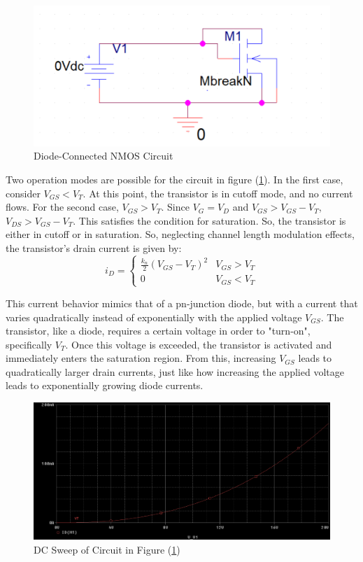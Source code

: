 \FloatBarrier

\begin{figure}[h!]
	\centering
	\includegraphics[scale=0.75]{./images/circuit3.PNG}
	\caption{Diode-Connected NMOS Circuit}
	\label{fig:circuit3}
\end{figure}

\FloatBarrier

Two operation modes are possible for the circuit in figure (\ref{fig:circuit3}). In the first case, consider $V_{GS} < V_{T}$. At this point, the transistor is in cutoff mode, and no current flows. For the second case, $V_{GS} > V_{T}$. Since $V_{G} = V_{D}$ and $V_{GS} > V_{GS} - V_{T}$, $V_{DS} > V_{GS} - V_{T}$. This satisfies the condition for saturation. So, the transistor is either in cutoff or in saturation. So, neglecting channel length modulation effects, the transistor's drain current is given by: \\

\begin{equation}
	\label{eq:diode_drain_current}
	i_{D} =
	\begin{cases}
		\frac{k_n}{2} ( V_{GS} - V_{T} )^2 & V_{GS} > V_{T} \\
		0 & V_{GS} < V_{T}
	\end{cases}
\end{equation}

This current behavior mimics that of a pn-junction diode, but with a current that varies quadratically instead of exponentially with the applied voltage $V_{GS}$. The transistor, like a diode, requires a certain voltage in order to "turn-on", specifically $V_{T}$. Once this voltage is exceeded, the transistor is activated and immediately enters the saturation region. From this, increasing $V_{GS}$ leads to quadratically larger drain currents, just like how increasing the applied voltage leads to exponentially growing diode currents.

\FloatBarrier

\begin{figure}[h!]
	\centering
	\includegraphics[scale=0.50]{./images/circuit3_dc_sweep.PNG}
	\caption{DC Sweep of Circuit in Figure (\ref{fig:circuit3})}
	\label{fig:circuit3_dc_sweep}
\end{figure}

\FloatBarrier
